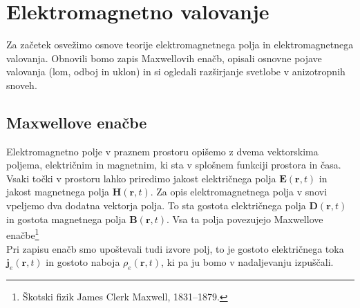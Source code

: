 
\chapter{Elektromagnetno valovanje}
Za začetek osvežimo osnove teorije elektromagnetnega polja in elektromagnetnega valovanja. 
Obnovili bomo zapis Maxwellovih enačb, opisali osnovne pojave valovanja (lom, odboj in uklon)
in si ogledali razširjanje svetlobe v anizotropnih snoveh. 

\section{Maxwellove enačbe}
Elektromagnetno polje v praznem prostoru opišemo z dvema vektorskima
poljema, električnim in magnetnim, ki sta v splošnem funkciji prostora
in časa. Vsaki točki v prostoru lahko priredimo jakost
električnega polja $\mathbf{E}(\mathbf{r},t)$ in jakost
magnetnega polja $\mathbf{H}(\mathbf{r},t)$. Za opis elektromagnetnega
polja v snovi vpeljemo dva dodatna vektorja polja. To sta gostota
električnega polja $\mathbf{D}(\mathbf{r},t)$ in gostota magnetnega
polja $\mathbf{B}(\mathbf{r},t)$.
Vsa ta polja povezujejo Maxwellove enačbe\footnote{
Škotski fizik James Clerk Maxwell, 1831--1879.}
\\
Pri zapisu enačb smo upoštevali tudi izvore polj, to je gostoto
električnega toka $\mathbf{j}_e(\mathbf{r},t)$ in gostoto naboja $\rho_{e}(\mathbf{r},t)$, ki 
pa ju bomo v nadaljevanju izpuščali.

